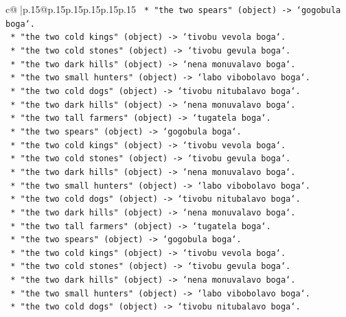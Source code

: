 \documentclass{article}
\begin{document}
{\begin{supertabular}{c@{$\;$}|p{.15\linewidth}@{}p{.15\linewidth}p{.15\linewidth}p{.15\linewidth}p{.15\linewidth}p{.15\linewidth}}
{{{\texttt{        *   "the two spears" (object) {-}> `gogobula boga`.} \\
\texttt{        *   "the two cold kings" (object) {-}> `tivobu vevola boga`.} \\
\texttt{        *   "the two cold stones" (object) {-}> `tivobu gevula boga`.} \\
\texttt{        *   "the two dark hills" (object) {-}> `nena monuvalavo boga`.} \\
\texttt{        *   "the two small hunters" (object) {-}> `labo vibobolavo boga`.} \\
\texttt{        *   "the two cold dogs" (object) {-}> `tivobu nitubalavo boga`.} \\
\texttt{        *   "the two dark hills" (object) {-}> `nena monuvalavo boga`.} \\
\texttt{        *   "the two tall farmers" (object) {-}> `tugatela boga`.} \\
\texttt{        *   "the two spears" (object) {-}> `gogobula boga`.} \\
\texttt{        *   "the two cold kings" (object) {-}> `tivobu vevola boga`.} \\
\texttt{        *   "the two cold stones" (object) {-}> `tivobu gevula boga`.} \\
\texttt{        *   "the two dark hills" (object) {-}> `nena monuvalavo boga`.} \\
\texttt{        *   "the two small hunters" (object) {-}> `labo vibobolavo boga`.} \\
\texttt{        *   "the two cold dogs" (object) {-}> `tivobu nitubalavo boga`.} \\
\texttt{        *   "the two dark hills" (object) {-}> `nena monuvalavo boga`.} \\
\texttt{        *   "the two tall farmers" (object) {-}> `tugatela boga`.} \\
\texttt{        *   "the two spears" (object) {-}> `gogobula boga`.} \\
\texttt{        *   "the two cold kings" (object) {-}> `tivobu vevola boga`.} \\
\texttt{        *   "the two cold stones" (object) {-}> `tivobu gevula boga`.} \\
\texttt{        *   "the two dark hills" (object) {-}> `nena monuvalavo boga`.} \\
\texttt{        *   "the two small hunters" (object) {-}> `labo vibobolavo boga`.} \\
\texttt{        *   "the two cold dogs" (object) {-}> `tivobu nitubalavo boga`.} \\
}}}
\end{supertabular}}
\end{document}

